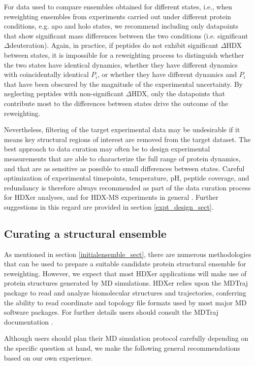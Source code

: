 \documentclass[9pt,tutorial]{livecoms}
\begin{document}
For data used to compare ensembles obtained for different states, i.e., when reweighting ensembles from experiments carried out under different protein conditions, e.g. apo and holo states, we recommend including only datapoints that show significant mass differences between the two conditions (i.e. significant $\Delta$deuteration).
Again, in practice, if peptides do not exhibit significant $\Delta$HDX between states, it is impossible for a reweighting process to distinguish whether the two states have identical dynamics, whether they have different dynamics with coincidentally identical $P_i$, or whether they have different dynamics and $P_i$ that have been obscured by the magnitude of the experimental uncertainty.
By neglecting peptides with non-significant $\Delta$HDX, only the datapoints that contribute most to the differences between states drive the outcome of the reweighting.

Nevertheless, filtering of the target experimental data may be undesirable if it means key structural regions of interest are removed from the target dataset.
The best approach to data curation may often be to design experimental measurements that are able to characterize the full range of protein dynamics, and that are as sensitive as possible to small differences between states.
Careful optimization of experimental timepoints, temperature, pH, peptide coverage, and redundancy is therefore always recommended as part of the data curation process for HDXer analyses, and for HDX-MS experiments in general \cite{Masson2019}.
Further suggestions in this regard are provided in section \ref{expt_design_sect}.

\subsection{Curating a structural ensemble}
As mentioned in section \ref{initialensemble_sect}, there are numerous methodologies that can be used to prepare a suitable candidate protein structural ensemble for reweighting.
However, we expect that most HDXer applications will make use of protein structures generated by MD simulations.
HDXer relies upon the MDTraj package to read and analyze biomolecular structures and trajectories, conferring the ability to read coordinate and topology file formats used by most major MD software packages.
For further details users should consult the MDTraj documentation \cite{McGibbon2015MDTraj}.

Although users should plan their MD simulation protocol carefully depending on the specific question at hand, we make the following general recommendations based on our own experience.
\end{document}
